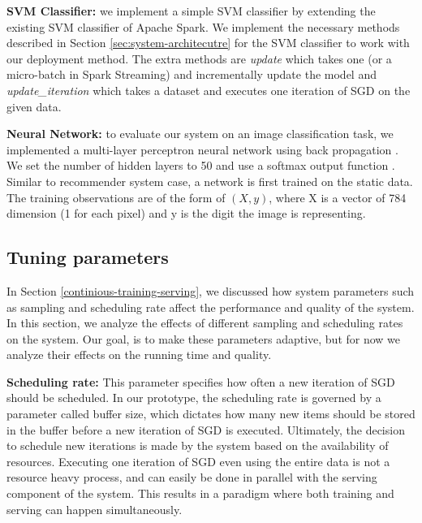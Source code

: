 \documentclass{vldb}
\begin{document}
\textbf{SVM Classifier:} we implement a simple SVM classifier by extending the existing SVM classifier of Apache Spark.
We implement the necessary methods described in Section \ref{sec:system-architecutre} for the SVM classifier to work with our deployment method.
The extra methods are \textit{update} which takes one (or a micro-batch in Spark Streaming) and incrementally update the model and \textit{update\_iteration} which takes a dataset and executes one iteration of SGD on the given data.

\textbf{Neural Network:} to evaluate our system on an image classification task, we implemented a multi-layer perceptron neural network using back propagation \cite{collobert2004links}.
We set the number of hidden layers to 50 and use a softmax output function \cite{bishop2006pattern}.
Similar to recommender system case, a network is first trained on the static data.
The training observations are of the form of \textit{\((X,y)\)}, where X is a vector of 784 dimension (1 for each pixel) and y is the digit the image is representing.

\subsection{Tuning parameters} \label{tuning}
In Section \ref{continious-training-serving}, we discussed how system parameters such as sampling and scheduling rate affect the performance and quality of the system.
In this section, we analyze the effects of different sampling and scheduling rates on the system.
Our goal, is to make these parameters adaptive, but for now we analyze their effects on the running time and quality. 

\textbf{Scheduling rate:} This parameter specifies how often a new iteration of SGD should be scheduled. 
In our prototype, the scheduling rate is governed by a parameter called buffer size, which dictates how many new items should be stored in the buffer before a new iteration of SGD is executed. 
Ultimately, the decision to schedule new iterations is made by the system based on the availability of resources. 
Executing one iteration of SGD even using the entire data is not a resource heavy process, and can easily be done in parallel with the serving component of the system. 
This results in a paradigm where both training and serving can happen simultaneously. 
\end{document}
